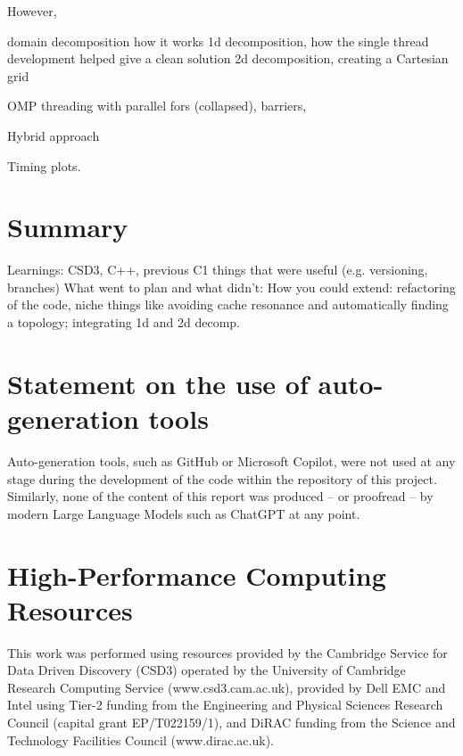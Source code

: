 \documentclass[12pt]{article}
\begin{document}
However,

domain decomposition how it works
1d decomposition, how the single thread development helped give a clean solution
2d decomposition, creating a Cartesian grid

OMP threading with parallel fors (collapsed), barriers,

Hybrid approach

Timing plots.

\section*{Summary}

Learnings: CSD3, C++, previous C1 things that were useful (e.g. versioning, branches)
What went to plan and what didn't:
How you could extend: refactoring of the code, niche things like avoiding cache resonance and automatically finding a topology; integrating 1d and 2d decomp.




\appendix

\section{Statement on the use of auto-generation tools}

Auto-generation tools, such as GitHub or Microsoft Copilot, were not used at any stage during the development of the code within the repository of this project.
Similarly, none of the content of this report was produced -- or proofread -- by modern Large Language Models such as ChatGPT at any point.

\section {High-Performance Computing Resources}

This work was performed using resources provided by the Cambridge Service for Data Driven Discovery (CSD3) operated by the University of Cambridge Research Computing Service (www.csd3.cam.ac.uk),
provided by Dell EMC and Intel using Tier-2 funding from the Engineering and Physical Sciences Research Council (capital grant EP/T022159/1),
and DiRAC funding from the Science and Technology Facilities Council (www.dirac.ac.uk).
\end{document}
